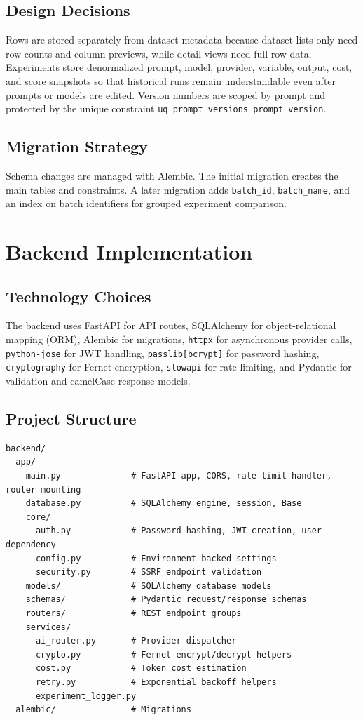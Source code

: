 \documentclass[12pt,a4paper]{report}
\begin{document}
\section{Design Decisions}
Rows are stored separately from dataset metadata because dataset lists only need row counts and column previews, while detail views need full row data. Experiments store denormalized prompt, model, provider, variable, output, cost, and score snapshots so that historical runs remain understandable even after prompts or models are edited. Version numbers are scoped by prompt and protected by the unique constraint \texttt{uq\_prompt\_versions\_prompt\_version}.

\section{Migration Strategy}
Schema changes are managed with Alembic. The initial migration creates the main tables and constraints. A later migration adds \texttt{batch\_id}, \texttt{batch\_name}, and an index on batch identifiers for grouped experiment comparison.

\chapter{Backend Implementation}

\section{Technology Choices}
The backend uses FastAPI for API routes, SQLAlchemy for object-relational mapping (ORM), Alembic for migrations, \texttt{httpx} for asynchronous provider calls, \texttt{python-jose} for JWT handling, \texttt{passlib[bcrypt]} for password hashing, \texttt{cryptography} for Fernet encryption, \texttt{slowapi} for rate limiting, and Pydantic for validation and camelCase response models.

\section{Project Structure}
\begin{lstlisting}
backend/
  app/
    main.py              # FastAPI app, CORS, rate limit handler, router mounting
    database.py          # SQLAlchemy engine, session, Base
    core/
      auth.py            # Password hashing, JWT creation, user dependency
      config.py          # Environment-backed settings
      security.py        # SSRF endpoint validation
    models/              # SQLAlchemy database models
    schemas/             # Pydantic request/response schemas
    routers/             # REST endpoint groups
    services/
      ai_router.py       # Provider dispatcher
      crypto.py          # Fernet encrypt/decrypt helpers
      cost.py            # Token cost estimation
      retry.py           # Exponential backoff helpers
      experiment_logger.py
  alembic/               # Migrations
\end{lstlisting}
\end{document}
